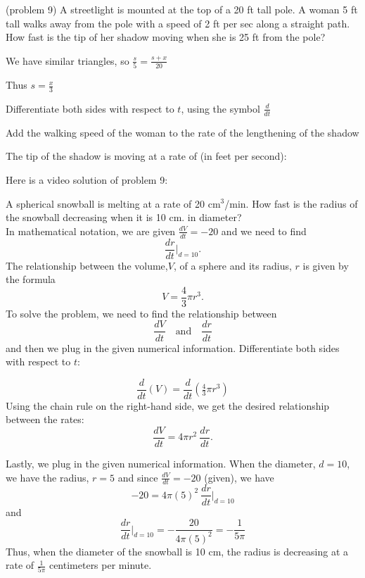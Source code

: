 \documentclass[handout]{ximera}
\begin{document}
\begin{problem}(problem 9)
A streetlight is mounted at the top of a 20 ft tall pole.  
A woman 5 ft tall walks away from the pole with a speed of 2 ft per sec along a straight path.  
How fast is the tip of her shadow moving when she is 25 ft from
the pole?
\begin{hint}
We have similar triangles, so $\frac{s}{5}=\frac{s+x}{20}$
\end{hint}
\begin{hint}
Thus $s=\frac{x}{3}$
\end{hint}
\begin{hint}
Differentiate both sides with respect to $t$, using the symbol $\frac{d}{dt}$
\end{hint}
\begin{hint}
Add the walking speed of the woman to the rate of the lengthening of the shadow
\end{hint}

The tip of the shadow is moving at a rate of (in feet per second):
\begin{multipleChoice}
\end{multipleChoice}
\end{problem}

Here is a video solution of  problem 9:
\begin{foldable}
\end{foldable}

\begin{example}[example 10]
A spherical snowball is melting at a rate of 20 cm$^3$/min. How fast is the radius of the snowball
decreasing when it is 10 cm. in diameter?\\
In mathematical notation, we are given $\frac{dV}{dt} = -20$ and we need to find
\[\frac{dr}{dt}\bigg|_{d = 10}.\]
The relationship between the volume,$V$, of a sphere and its radius, $r$ is given by the formula 
\[V = \frac43 \pi r^3.\]
To solve the problem, we need to find the relationship between 
\[\frac{dV}{dt} \quad \text{and} \quad \frac{dr}{dt}\]
and then we plug in the given numerical information.
Differentiate both sides with respect to $t$:




\[\frac{d}{dt} (V) = \frac{d}{dt}(\tfrac43 \pi r^3)\]
Using the chain rule on the right-hand side, we get the desired relationship between the rates:
\[\frac{dV}{dt}  = 4\pi r^2 \  \frac{dr}{dt}.\]

Lastly, we plug in the given numerical information. When the diameter,  $d = 10$, we have the radius, $r = 5$ and since $\frac{dV}{dt}=-20$ (given), we have
\[-20  = 4\pi (5)^2 \ \frac{dr}{dt}\bigg|_{d = 10}\]
and
\[\frac{dr}{dt}\bigg|_{d = 10} = -\frac{20}{4\pi (5)^2} = -\frac{1}{5\pi} \]
Thus, when the diameter of the snowball is  10 cm, the radius is decreasing at a rate of $\frac{1}{5\pi}$ centimeters per minute.
\end{example}
\end{document}
